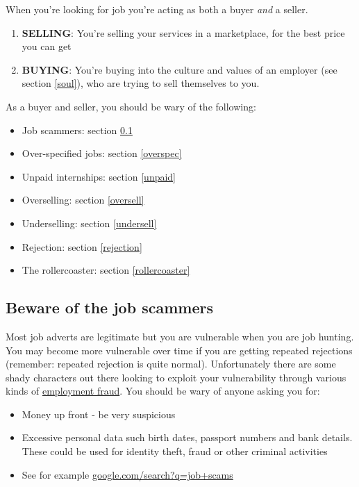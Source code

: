 \documentclass[
]{book}
\providecommand{\tightlist}{%
  \setlength{\itemsep}{0pt}\setlength{\parskip}{0pt}}
\begin{document}
When you're looking for job you're acting as both a buyer \emph{and} a seller.

\begin{enumerate}
\def\labelenumi{\arabic{enumi}.}
\tightlist
\item
  \textbf{SELLING}: You're selling your services in a marketplace, for the best price you can get
\item
  \textbf{BUYING}: You're buying into the culture and values of an employer (see section \ref{soul}), who are trying to sell themselves to you.
\end{enumerate}

As a buyer and seller, you should be wary of the following:

\begin{itemize}
\tightlist
\item
  Job scammers: section \ref{scams}
\item
  Over-specified jobs: section \ref{overspec}
\item
  Unpaid internships: section \ref{unpaid}
\item
  Overselling: section \ref{oversell}
\item
  Underselling: section \ref{undersell}
\item
  Rejection: section \ref{rejection}
\item
  The rollercoaster: section \ref{rollercoaster} 🎢
\end{itemize}

\hypertarget{scams}{%
\subsection{Beware of the job scammers}\label{scams}}

Most job adverts are legitimate but you are vulnerable when you are job hunting. You may become more vulnerable over time if you are getting repeated rejections (remember: repeated rejection is quite normal). Unfortunately there are some shady characters out there looking to exploit your vulnerability through various kinds of \href{https://en.wikipedia.org/wiki/Employment_fraud}{employment fraud}. \citep{jobscammers} You should be wary of anyone asking you for:

\begin{itemize}
\tightlist
\item
  Money up front - be very suspicious
\item
  Excessive personal data such birth dates, passport numbers and bank details. These could be used for identity theft, fraud or other criminal activities
\item
  See for example \href{https://www.google.com/search?q=job+scams}{google.com/search?q=job+scams}
\end{itemize}
\end{document}
